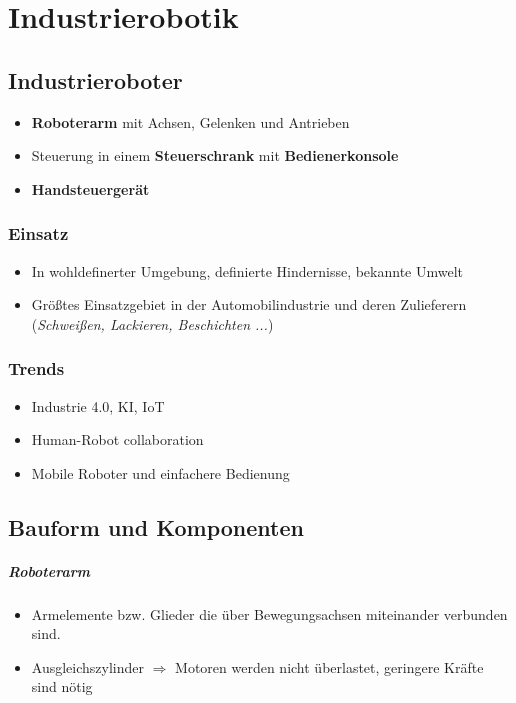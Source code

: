 \chapter{Industrierobotik}
\section{Industrieroboter}
\begin{itemize}
	\item \textbf{Roboterarm} mit Achsen, Gelenken und Antrieben
	\item Steuerung in einem \textbf{Steuerschrank} mit \textbf{Bedienerkonsole}
	\item \textbf{Handsteuergerät}
\end{itemize}
\subsection{Einsatz}
\begin{itemize}
	\item In wohldefinerter Umgebung, definierte Hindernisse, bekannte Umwelt
	\item Größtes Einsatzgebiet in der Automobilindustrie und deren Zulieferern (\textit{Schweißen, Lackieren, Beschichten ...})
\end{itemize}
\subsection{Trends}
\begin{itemize}
	\item Industrie 4.0, KI, IoT
	\item Human-Robot collaboration
	\item Mobile Roboter und einfachere Bedienung
\end{itemize}
\section{Bauform und Komponenten}
\paragraph{Roboterarm}
\begin{itemize}
	\item Armelemente bzw. Glieder die über Bewegungsachsen miteinander verbunden sind.
	\item Ausgleichszylinder $\Rightarrow$ Motoren werden nicht überlastet, geringere Kräfte sind nötig
\end{itemize}
